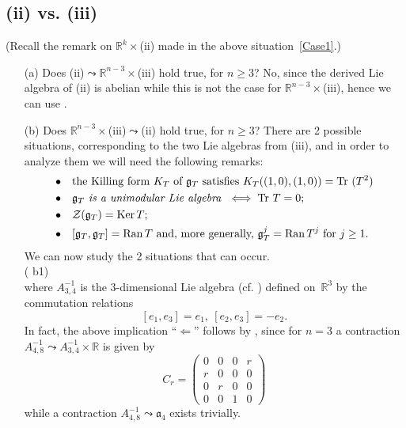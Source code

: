 \documentclass[
reqno]{amsart}
\begin{document}
\subsection{(ii) vs. (iii)}\label{Case6} 
(Recall the remark on ${{\mathbb R}}^k\times$(ii) made in the above situation~\ref{Case1}.)
\begin{itemize}
\item[(a)] Does (ii)${\leadsto}$${{\mathbb R}}^{n-3}\times$(iii) hold true, for $n\ge 3$? 
No, since the derived  Lie algebra of (ii) is abelian while this is not the case for ${{\mathbb R}}^{n-3}\times$(iii), 
hence we can use \cite[Th. 1(4)]{NP06}. 
\item[(b)] Does ${{\mathbb R}}^{n-3}\times$(iii)${\leadsto}$(ii) hold true, for $n\ge 3$?  
There are 2 possible situations, corresponding to the two Lie algebras from (iii), 
and in order to analyze them we will need the following remarks:
\begin{align}
\label{Killing} 
\bullet\quad &  \text{the Killing form $K_{T}$ of ${{\mathfrak g}}_T$ satisfies $K_T((1,0),(1,0))={{\rm Tr}\,}\,(T^2)$}\\
\label{unimodular}
\bullet\quad & {{\mathfrak g}}_T \emph{ is a unimodular Lie algebra }\iff {{\rm Tr}\,}\, T=0; \\
\label{center}
\bullet\quad &{{\mathcal Z}}({{\mathfrak g}}_T)={{\rm Ker}\,} T; \\
\label{derived}
\bullet\quad &[{{\mathfrak g}}_T,{{\mathfrak g}}_T]={{\rm Ran}\,} T \text{ and, more generally, }{{\mathfrak g}}_T^{j}={{\rm Ran}\,} T^j \text{ for }j\ge1.
\end{align}
We can now study the 2 situations that can occur.  
\\ ({{\bfseries\itshape} b1})  
\\ where $A_{3,4}^{-1}$ is the 3-dimensional Lie algebra (cf. \cite[\S VI.A]{NP06}) 
defined on~${{\mathbb R}}^3$ by the commutation relations 
\begin{equation}\label{A34-1}
[e_1,e_3]=e_1,\ [e_2,e_3]=-e_2. 
\end{equation}
In fact, the above implication ``$\Leftarrow$'' follows by \cite[\S VI.B]{NP06}, 
since for $n=3$ a contraction $A_{4,8}^{-1}{\leadsto} A_{3,4}^{-1}\times{{\mathbb R}}$ 
is given by 
$$C_r
=\begin{pmatrix}
0 & 0 & 0 & r \\
r & 0& 0 & 0 \\
0 & r & 0 & 0 \\
0 & 0 & 1 & 0 
\end{pmatrix}$$
while a contraction $A_{4,8}^{-1}{\leadsto} {{\mathfrak a}}_4$ exists trivially. 


\end{itemize}
\end{document}
